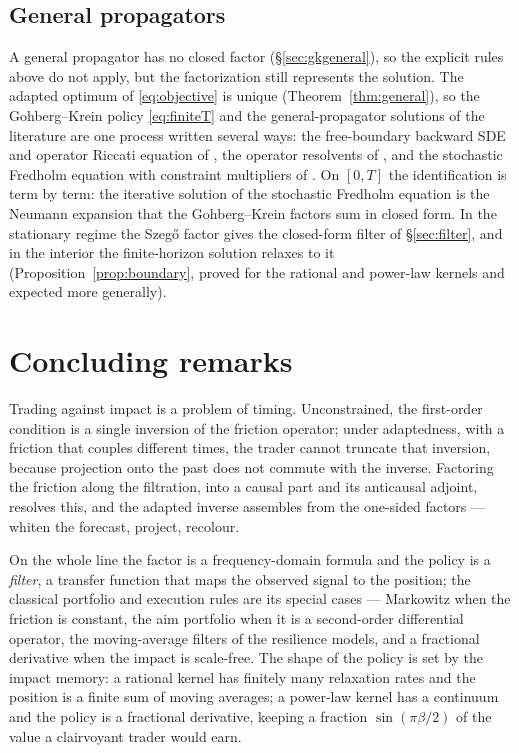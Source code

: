 \documentclass[11pt]{article}
\theoremstyle{plain}
\theoremstyle{definition}
\theoremstyle{remark}
\begin{document}
\subsection{General propagators}\label{sec:general}

A general propagator has no closed factor (\S\ref{sec:gkgeneral}), so the explicit rules above do not apply, but the factorization still represents the solution. The adapted optimum of \eqref{eq:objective} is unique (Theorem~\ref{thm:general}), so the Gohberg--Krein policy \eqref{eq:finiteT} and the general-propagator solutions of the literature are one process written several ways: the free-boundary backward SDE and operator Riccati equation of \citet{AbiJaberNeuman2025}, the operator resolvents of \citet{AbiJaberNeumanTuschmann2024}, and the stochastic Fredholm equation with constraint multipliers of \citet{AbiJaberDeCarvalhoPham2024}. On $[0,T]$ the identification is term by term: the iterative solution of the stochastic Fredholm equation is the Neumann expansion that the Gohberg--Krein factors sum in closed form. In the stationary regime the Szeg\H{o} factor gives the closed-form filter of \S\ref{sec:filter}, and in the interior the finite-horizon solution relaxes to it (Proposition~\ref{prop:boundary}, proved for the rational and power-law kernels and expected more generally).

\section{Concluding remarks}\label{sec:conclusion}

Trading against impact is a problem of timing. Unconstrained, the first-order condition is a single inversion of the friction operator; under adaptedness, with a friction that couples different times, the trader cannot truncate that inversion, because projection onto the past does not commute with the inverse. Factoring the friction along the filtration, into a causal part and its anticausal adjoint, resolves this, and the adapted inverse assembles from the one-sided factors --- whiten the forecast, project, recolour.

On the whole line the factor is a frequency-domain formula and the policy is a \emph{filter}, a transfer function that maps the observed signal to the position; the classical portfolio and execution rules are its special cases --- Markowitz when the friction is constant, the aim portfolio when it is a second-order differential operator, the moving-average filters of the resilience models, and a fractional derivative when the impact is scale-free. The shape of the policy is set by the impact memory: a rational kernel has finitely many relaxation rates and the position is a finite sum of moving averages; a power-law kernel has a continuum and the policy is a fractional derivative, keeping a fraction $\sin(\pi\beta/2)$ of the value a clairvoyant trader would earn.
\end{document}
